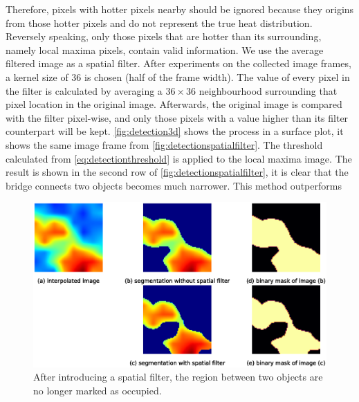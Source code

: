 Therefore, pixels with hotter pixels nearby should be ignored because they origins from those hotter pixels and do not represent the true heat distribution. Reversely speaking, only those pixels that are hotter than its surrounding, namely local maxima pixels, contain valid information. We use the average filtered image as a spatial filter. After experiments on the collected image frames, a kernel size of 36 is chosen (half of the frame width). The value of every pixel in the filter is calculated by averaging a $36\times36$ neighbourhood surrounding that pixel location in the original image. Afterwards, the original image is compared with the filter pixel-wise, and only those pixels with a value higher than its filter counterpart will be kept. \autoref{fig:detection3d} shows the process in a surface plot, it shows the same image frame from \autoref{fig:detectionspatialfilter}. The threshold calculated from \autoref{eq:detectionthreshold} is applied to the local maxima image. The result is shown in the second row of \autoref{fig:detectionspatialfilter}, it is clear that the bridge connects two objects becomes much narrower. This method outperforms 
\begin{figure}
  \centering
  \includegraphics[width=\textwidth]{figures/detect_spatialfilter.eps}
  \caption{After introducing a spatial filter, the region between two objects are no longer marked as occupied.}\label{fig:detectionspatialfilter}
\end{figure}
